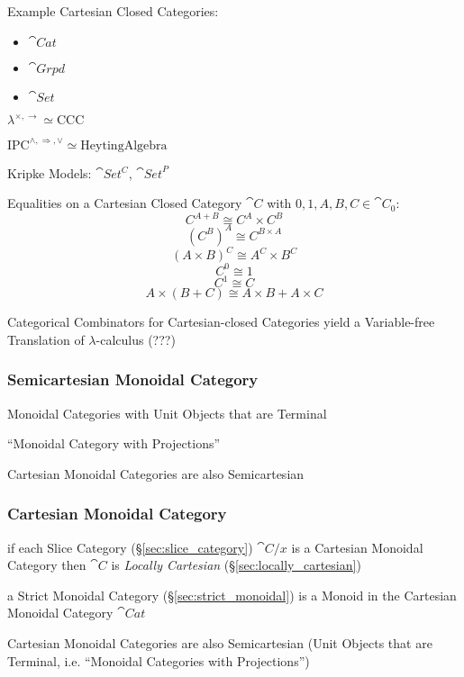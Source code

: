 Example Cartesian Closed Categories:
\begin{itemize}
\item $\cat{Cat}$
\item $\cat{Grpd}$
\item $\cat{Set}$
\end{itemize}

$\lambda^{\times, \rightarrow} \simeq \mathrm{CCC}$

$\mathrm{IPC}^{\wedge, \Rightarrow, \vee} \simeq \mathrm{Heyting Algebra}$

Kripke Models: $\cat{Set^C}$, $\cat{Set}^P$ %

Equalities on a Cartesian Closed Category $\cat{C}$ with
$0,1,A,B,C \in \cat{C}_0$:
\[
  C^{A + B} \cong C^A \times C^B
\]\[
  (C^B)^A \cong C^{B \times A}
\]\[
  (A \times B)^C \cong A^C \times B^C
\]\[
  C^0 \cong 1
\]\[
  C^1 \cong C
\]\[
  A \times (B + C) \cong A \times B + A \times C
\]

Categorical Combinators for Cartesian-closed Categories yield a
Variable-free Translation of $\lambda$-calculus (???)



\subsubsection{Semicartesian Monoidal Category}
\label{sec:semicartesian_monoidal}

Monoidal Categories with Unit Objects that are Terminal

``Monoidal Category with Projections''

Cartesian Monoidal Categories are also Semicartesian



\subsubsection{Cartesian Monoidal Category}
\label{sec:cartesian_monoidal}

if each Slice Category (\S\ref{sec:slice_category}) $\cat{C}/x$ is a
Cartesian Monoidal Category then $\cat{C}$ is \emph{Locally Cartesian}
(\S\ref{sec:locally_cartesian})

a Strict Monoidal Category (\S\ref{sec:strict_monoidal}) is a Monoid
in the Cartesian Monoidal Category $\cat{Cat}$

Cartesian Monoidal Categories are also Semicartesian (Unit Objects
that are Terminal, i.e. ``Monoidal Categories with Projections'')



